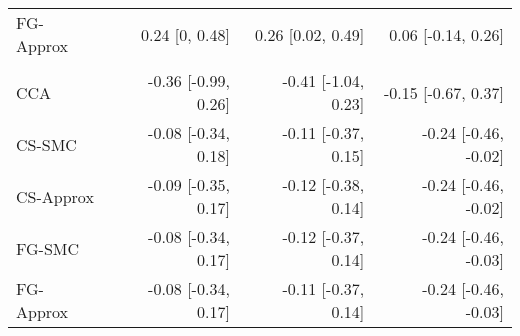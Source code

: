 \documentclass[
  12pt,
  a4paper,
]{article}
\begin{document}
\begin{longtable}[t]{lrrr}
\hspace{1em}FG-Approx & 0.24 [0, 0.48] & 0.26 [0.02, 0.49] & 0.06 [-0.14, 0.26]\\
\addlinespace[0.3em]
\multicolumn{4}{l}{\textbf{Year of alloHCT (decades)}}\\
\hspace{1em}CCA & -0.36 [-0.99, 0.26] & -0.41 [-1.04, 0.23] & -0.15 [-0.67, 0.37]\\
\hspace{1em}CS-SMC & -0.08 [-0.34, 0.18] & -0.11 [-0.37, 0.15] & -0.24 [-0.46, -0.02]\\
\hspace{1em}CS-Approx & -0.09 [-0.35, 0.17] & -0.12 [-0.38, 0.14] & -0.24 [-0.46, -0.02]\\
\hspace{1em}FG-SMC & -0.08 [-0.34, 0.17] & -0.12 [-0.37, 0.14] & -0.24 [-0.46, -0.03]\\
\hspace{1em}FG-Approx & -0.08 [-0.34, 0.17] & -0.11 [-0.37, 0.14] & -0.24 [-0.46, -0.03]\\*

\end{longtable}

\endgroup{}
\end{document}
